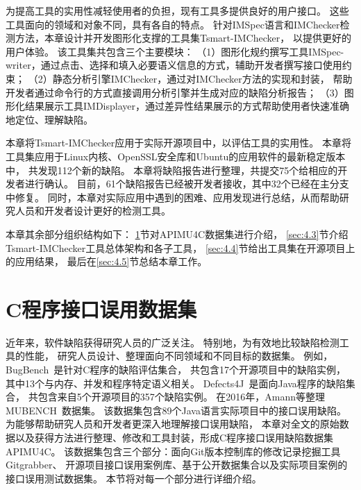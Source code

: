 为提高工具的实用性减轻使用者的负担，现有工具多提供良好的用户接口。
这些工具面向的领域和对象不同，具有各自的特点。
针对IMSpec语言和IMChecker检测方法，本章设计并开发图形化支撑的工具集Tsmart-IMChecker，
以提供更好的用户体验。
该工具集共包含三个主要模块：
（1）图形化规约撰写工具IMSpec-writer，通过点击、选择和填入必要语义信息的方式，辅助开发者撰写接口使用约束；
（2）静态分析引擎IMChecker，通过对IMChecker方法的实现和封装，
帮助开发者通过命令行的方式直接调用分析引擎并生成对应的缺陷分析报告；
（3）图形化结果展示工具IMDisplayer，通过差异性结果展示的方式帮助使用者快速准确地定位、理解缺陷。

本章将Tsmart-IMChecker应用于实际开源项目中，以评估工具的实用性。
本章将工具集应用于Linux内核、OpenSSL安全库和Ubuntu的应用软件的最新稳定版本中，
共发现112个新的缺陷。
本章将缺陷报告进行整理，共提交75个给相应的开发者进行确认。
目前，61个缺陷报告已经被开发者接收，其中32个已经在主分支中修复。
同时，本章对实际应用中遇到的困难、应用发现进行总结，从而帮助研究人员和开发者设计更好的检测工具。



本章其余部分组织结构如下：
\ref{sec:4.2}节对APIMU4C数据集进行介绍，
\ref{sec:4.3}节介绍Tsmart-IMChecker工具总体架构和各子工具，
\ref{sec:4.4}节给出工具集在开源项目上的应用结果，
最后在\ref{sec:4.5}节总结本章工作。

\section{C程序接口误用数据集}
\label{sec:4.2}
近年来，软件缺陷获得研究人员的广泛关注。
特别地，为有效地比较缺陷检测工具的性能，
研究人员设计、整理面向不同领域和不同目标的数据集。
例如，BugBench~\cite{05-bugbench}是针对C程序的缺陷评估集合，
共包含17个开源项目中的缺陷实例，
其中13个与内存、并发和程序特定语义相关。
Defects4J~\cite{14-issta-defects4j}是面向Java程序的缺陷集合，
共包含来自5个开源项目的357个缺陷实例。
在2016年，Amann等整理MUBENCH~\cite{16-msr-mubench}数据集。
该数据集包含89个Java语言实际项目中的接口误用缺陷。
为能够帮助研究人员和开发者更深入地理解接口误用缺陷，
本章对全文的原始数据以及获得方法进行整理、修改和工具封装，形成C程序接口误用缺陷数据集APIMU4C。
该数据集包含三个部分：面向Git版本控制库的修改记录挖掘工具Gitgrabber、
开源项目接口误用案例库、基于公开数据集合以及实际项目案例的接口误用测试数据集。
本节将对每一个部分进行详细介绍。

